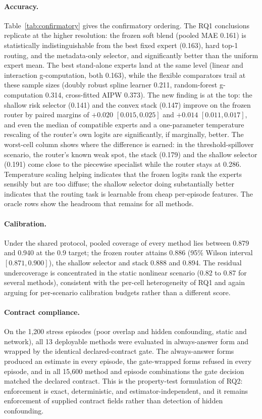 \documentclass[electronics,article,submit,oneauthor]{Definitions/mdpi}
\begin{document}
\paragraph{Accuracy.} Table~\ref{tab:confirmatory} gives the confirmatory ordering. The RQ1 conclusions replicate at the higher resolution: the frozen soft blend (pooled MAE 0.161) is statistically indistinguishable from the best fixed expert (0.163), hard top-1 routing, and the metadata-only selector, and significantly better than the uniform expert mean. The best stand-alone experts land at the same level (linear and interaction g-computation, both 0.163), while the flexible comparators trail at these sample sizes (doubly robust spline learner 0.211, random-forest g-computation 0.314, cross-fitted AIPW 0.373). The new finding is at the top: the shallow risk selector (0.141) and the convex stack (0.147) improve on the frozen router by paired margins of $+0.020$ $[0.015, 0.025]$ and $+0.014$ $[0.011, 0.017]$, and even the median of compatible experts and a one-parameter temperature rescaling of the router's own logits are significantly, if marginally, better. The worst-cell column shows where the difference is earned: in the threshold-spillover scenario, the router's known weak spot, the stack (0.179) and the shallow selector (0.191) come close to the piecewise specialist while the router stays at 0.286. Temperature scaling helping indicates that the frozen logits rank the experts sensibly but are too diffuse; the shallow selector doing substantially better indicates that the routing task is learnable from cheap per-episode features. The oracle rows show the headroom that remains for all methods.

\paragraph{Calibration.} Under the shared protocol, pooled coverage of every method lies between 0.879 and 0.940 at the 0.9 target; the frozen router attains 0.886 (95\% Wilson interval $[0.871, 0.900]$), the shallow selector and stack 0.888 and 0.894. The residual undercoverage is concentrated in the static nonlinear scenario (0.82 to 0.87 for several methods), consistent with the per-cell heterogeneity of RQ1 and again arguing for per-scenario calibration budgets rather than a different score.

\paragraph{Contract compliance.} On the 1,200 stress episodes (poor overlap and hidden confounding, static and network), all 13 deployable methods were evaluated in always-answer form and wrapped by the identical declared-contract gate. The always-answer forms produced an estimate in every episode, the gate-wrapped forms refused in every episode, and in all 15,600 method and episode combinations the gate decision matched the declared contract. This is the property-test formulation of RQ2: enforcement is exact, deterministic, and estimator-independent, and it remains enforcement of supplied contract fields rather than detection of hidden confounding.
\end{document}
